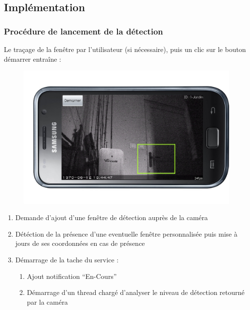   \subsection{Implémentation}
  \begin{frame}
   \frametitle{Procédure de lancement de la détection}
   Le traçage de la fenêtre par l'utilisateur (si nécessaire), puis un clic sur
   \newline le bouton démarrer entraîne :
   \begin{figure}[H]
 \centering\includegraphics[scale=0.10]{Images/samsung-galaxy-s-vue3.jpg}
      \end{figure}
    \begin{enumerate}
    \item Demande d'ajout d'une fenêtre de détection auprès de la caméra
    \item Détéction de la présence d'une eventuelle fenêtre personnalisée puis
    mise à jours de ses coordonnées en cas de présence
    \item Démarrage de la tache du service :
     \begin{enumerate}
       \item Ajout notification ``En-Cours''
       \item Démarrage d'un thread chargé d'analyser le niveau de détection
       retourné par la caméra
       \end{enumerate}
   \end{enumerate}
  \end{frame}